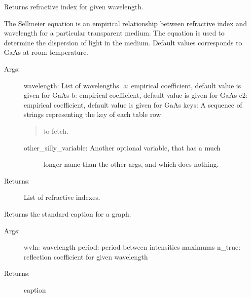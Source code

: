 \documentclass[letterpaper,10pt,english]{sphinxmanual}
\begin{document}
\begin{fulllineitems}
\label{\detokenize{GUI:GUI.sellmeyer_eq}}
Returns refractive index for given wavelength.

The Sellmeier equation is an empirical relationship between refractive 
index and wavelength for a particular transparent medium. 
The equation is used to determine the dispersion of light
in the medium. Default values corresponds to GaAs at room
temperature.
\begin{description}
\item[{Args:}] \leavevmode
wavelength: List of wavelengths.
a: empirical coefficient, default value is given for GaAs
b: empirical coefficient, default value is given for GaAs
c2: empirical coefficient, default value is given for GaAs
keys: A sequence of strings representing the key of each table row
\begin{quote}

to fetch.
\end{quote}
\begin{description}
\item[{other\_silly\_variable: Another optional variable, that has a much}] \leavevmode
longer name than the other args, and which does nothing.

\end{description}

\item[{Returns:}] \leavevmode
List of refractive indexes.

\end{description}

\end{fulllineitems}


\begin{fulllineitems}
\label{\detokenize{GUI:GUI.textstr}}
Returns the standard caption for a graph.
\begin{description}
\item[{Args:}] \leavevmode
wvln: wavelength
period: period between intensities maximums
n\_true: reflection coefficient for given wavelength

\item[{Returns:}] \leavevmode
caption

\end{description}

\end{fulllineitems}
\end{document}
